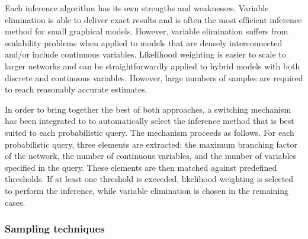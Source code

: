 Each inference algorithm has its own strengths and weaknesses. Variable elimination is able to deliver exact results and is often the most efficient inference method for small graphical models.  However, variable elimination suffers from scalability problems when applied to models that are densely interconnected and/or include continuous variables. Likelihood weighting is easier to scale to larger networks and can be straightforwardly applied to hybrid models with both discrete and continuous variables. However, large numbers of samples are required to reach reasonably accurate estimates.

In order to bring together the best of both approaches, a switching mechanism has been integrated to \opendial{} to automatically select the inference method that is best suited to each probabilistic query.  The mechanism proceeds as follows. For each probabilistic query, three elements are extracted: the maximum branching factor of the network, the number of continuous variables, and the number of variables specified in the query. These elements are then matched against predefined thresholds. If at least one threshold is exceeded, likelihood weighting is selected to perform the inference, while variable elimination is chosen in the remaining cases. 

\subsubsection*{Sampling techniques}

